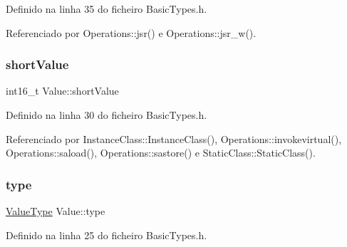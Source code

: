 Definido na linha 35 do ficheiro Basic\+Types.\+h.



Referenciado por Operations\+::jsr() e Operations\+::jsr\+\_\+w().

\mbox{\label{structValue_a9055b0f42ce03a06758b262c3bb32358}} 
\subsubsection{\texorpdfstring{short\+Value}{shortValue}}
{\footnotesize\ttfamily int16\+\_\+t Value\+::short\+Value}



Definido na linha 30 do ficheiro Basic\+Types.\+h.



Referenciado por Instance\+Class\+::\+Instance\+Class(), Operations\+::invokevirtual(), Operations\+::saload(), Operations\+::sastore() e Static\+Class\+::\+Static\+Class().

\mbox{\label{structValue_ab45dfd167290d4324ba4832abcc4064d}} 
\subsubsection{\texorpdfstring{type}{type}}
{\footnotesize\ttfamily \hyperlink{BasicTypes_8h_ad9971b6ef33e02ba2c75d19c1d2518a1}{Value\+Type} Value\+::type}



Definido na linha 25 do ficheiro Basic\+Types.\+h.



